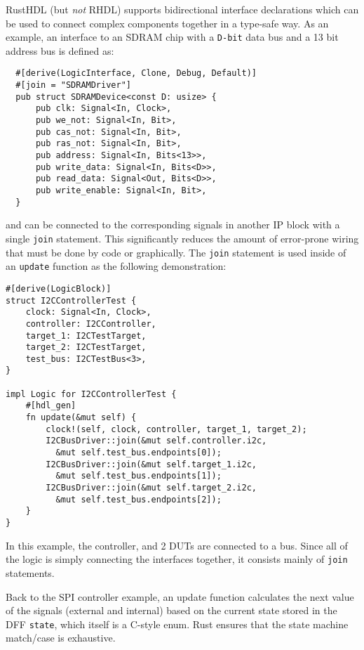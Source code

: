 \documentclass[sigplan,screen,sigconf]{acmart}
\begin{document}
RustHDL (but \emph{not} RHDL) supports bidirectional interface declarations which can 
be used to connect complex components together in a type-safe way.
As an example, an interface to an SDRAM chip with a \verb|D-bit| data bus and a 13 bit 
address bus is defined as:

\begin{verbatim}
  #[derive(LogicInterface, Clone, Debug, Default)]
  #[join = "SDRAMDriver"]
  pub struct SDRAMDevice<const D: usize> {
      pub clk: Signal<In, Clock>,
      pub we_not: Signal<In, Bit>,
      pub cas_not: Signal<In, Bit>,
      pub ras_not: Signal<In, Bit>,
      pub address: Signal<In, Bits<13>>,
      pub write_data: Signal<In, Bits<D>>,
      pub read_data: Signal<Out, Bits<D>>,
      pub write_enable: Signal<In, Bit>,
  }
\end{verbatim}

and can be connected to the corresponding signals in another IP block with a 
single \verb|join| statement.  This significantly reduces the amount of 
error-prone wiring that must be done by code or graphically.  The \verb|join| statement 
is used inside of an \verb|update| function as the following demonstration:

\begin{verbatim}
#[derive(LogicBlock)]
struct I2CControllerTest {
    clock: Signal<In, Clock>,
    controller: I2CController,
    target_1: I2CTestTarget,
    target_2: I2CTestTarget,
    test_bus: I2CTestBus<3>,
}

impl Logic for I2CControllerTest {
    #[hdl_gen]
    fn update(&mut self) {
        clock!(self, clock, controller, target_1, target_2);
        I2CBusDriver::join(&mut self.controller.i2c, 
          &mut self.test_bus.endpoints[0]);
        I2CBusDriver::join(&mut self.target_1.i2c,
          &mut self.test_bus.endpoints[1]);
        I2CBusDriver::join(&mut self.target_2.i2c, 
          &mut self.test_bus.endpoints[2]);
    }
}
\end{verbatim}

In this example, the controller, and 2 DUTs are connected to a bus.  
Since all of the logic is simply connecting the interfaces together, 
it consists mainly of \verb|join| statements. 

Back to the SPI controller example, an update function calculates the next value of the 
signals (external and internal) based on the current state stored in the DFF \verb|state|,
which itself is a C-style enum.  Rust ensures that the state machine match/case is exhaustive. 
\end{document}
